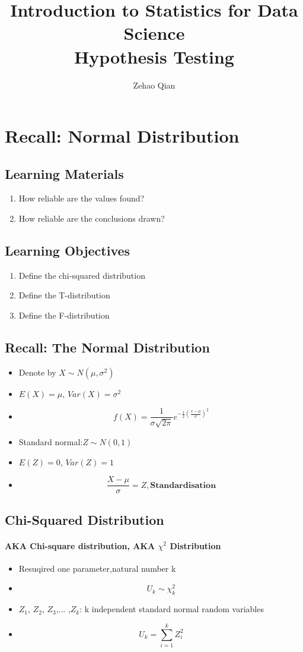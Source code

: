 \documentclass[11pt]{article} %
\title{Introduction to Statistics for Data Science \\ Hypothesis Testing}
\author{Zehao Qian}
\begin{document}
\maketitle
% 
% 
% 
\section{Recall: Normal Distribution}
\subsection{Learning Materials}
\begin{enumerate}
    \item How reliable are the values found?
    \item How reliable are the conclusions drawn?
\end{enumerate}
\subsection{Learning Objectives}
\begin{enumerate}
    \item Define the chi-squared distribution
    \item Define the T-distribution
    \item Define the F-distribution
\end{enumerate}
% 

\subsection{Recall: The Normal Distribution}
\begin{itemize}
    \item Denote by $X \sim N(\mu, \sigma^2)$
    \item $E(X)=\mu$, $Var(X)=\sigma^2$
    \item $$ f(X)=\frac{1}{\sigma \sqrt{2 \pi}}e^{-\frac{1}{2}(\frac{x-\mu}{\sigma})^2} $$
    \item Standard normal:$Z \sim N(0,1)$
    \item $E(Z)=0$, $Var(Z)=1$
    \item $$ \frac{X-\mu}{\sigma}=Z \mathbf{, Standardisation}$$
\end{itemize}
% 
% 
% 
% 
% 
\subsection{Chi-Squared Distribution}
\paragraph{AKA Chi-square distribution, AKA $\chi^2$ Distribution}
% 
% 
% 
\begin{itemize}
    \item Resuqired one parameter,natural number k
    \item $$ U_k \sim \chi_k^2 $$
    \item $Z_1$, $Z_2$, $Z_3$,... ,$Z_k$: k independent standard normal random variables
    \item $$ U_k = \sum_{i=1}^{k}Z_i^2 $$
\end{itemize}
% 
% 
\end{document}
